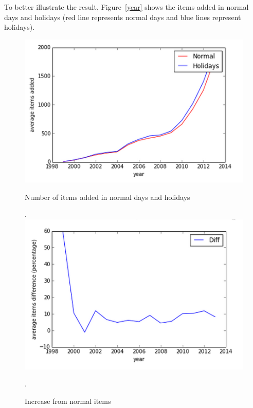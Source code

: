 \documentclass{llncs}
\begin{document}
To better illustrate the result, Figure~\ref{year} shows the items added in normal days and holidays (red line represents normal days and blue lines represent holidays). 

\begin{figure}[H]
  \includegraphics[width=\linewidth]{year.png}
  \caption{Number of items added in normal days and holidays}.
  \label{year}
\endminipage\hfill
{}%
  \includegraphics[width=\linewidth]{holiday.png}
  \caption{Increase from normal items }.
  \label{holiday}
\endminipage
\end{figure}
\end{document}

